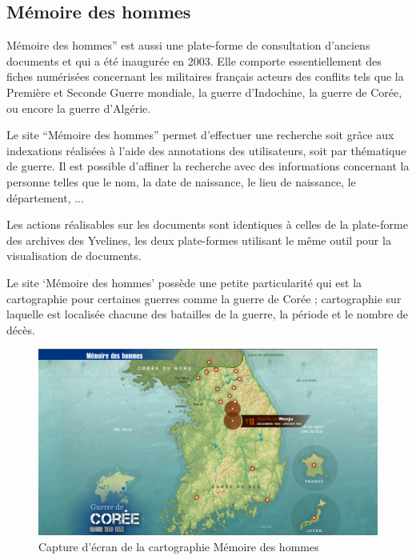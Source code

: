         \subsection{Mémoire des hommes}
        \label{subsec:memoire}
        Mémoire des hommes” est aussi une plate-forme de consultation d’anciens documents
        et qui a été inaugurée en 2003. Elle comporte essentiellement des fiches numérisées concernant
        les militaires français acteurs des conflits tels que la Première et Seconde Guerre mondiale,
        la guerre d’Indochine, la guerre de Corée, ou encore la guerre d’Algérie.

        Le site “Mémoire des hommes” permet d’effectuer une recherche soit grâce aux indexations
        réalisées à l’aide des annotations des utilisateurs, soit par thématique de guerre.
        Il est possible d’affiner la recherche avec des informations concernant la personne telles que le nom,
        la date de naissance, le lieu de naissance, le département, ...

        Les actions réalisables sur les documents sont identiques à celles de la plate-forme
        des archives des Yvelines, les deux plate-formes utilisant le même outil pour la visualisation
        de documents.

        Le site ‘Mémoire des hommes’ possède une petite particularité qui est la cartographie pour
        certaines guerres comme la guerre de Corée ; cartographie sur laquelle est localisée chacune
        des batailles de la guerre, la période et le nombre de décès.

        \begin{figure}[h!]
            \centering
            \includegraphics[width=1\textwidth]{figure/screen_memoire_hommes.png}
            \caption{Capture d'écran de la cartographie Mémoire des hommes}
            \label{fig:memoire_hommes}
        \end{figure}

